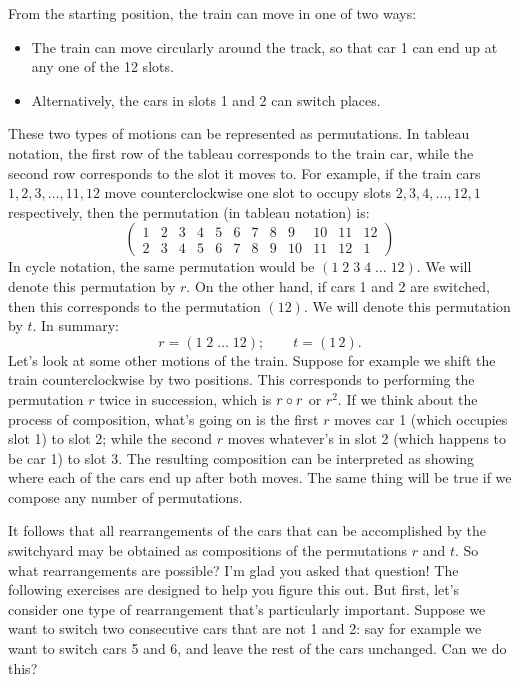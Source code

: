 From the starting position, the train can move in one of two ways:
\begin{itemize}
\item
The train can move circularly around the track, so that car 1 can end up at any one of the 12 slots. 
\item
Alternatively, the cars in slots 1 and 2 can switch places. 
\end{itemize}
These two types of motions can be represented as permutations. In tableau notation, the first row of the tableau corresponds to the train car, while the second row corresponds to the slot it moves to. For example, if the train cars $1,2,3, \ldots ,11, 12$ move counterclockwise one slot to occupy slots $2,3,4,\ldots ,12,1$ respectively, then the permutation (in tableau notation) is:
\[ \left( \begin{array}{cccccccccccc}
1 & 2 & 3 & 4 & 5 & 6 & 7 & 8 & 9 & 10 & 11 & 12 \\
2 & 3 & 4 & 5 & 6 & 7 & 8 & 9 & 10 & 11 & 12 & 1
 \end{array} \right)\] 
In cycle notation,  the same permutation would be $(1 \; 2 \; 3 \; 4 \; \ldots \; 12)$.  We will denote this permutation by $r$. On the other hand, if cars 1 and 2 are switched, then this corresponds to the permutation $(1 2)$. We will denote this permutation by $t$.  In summary:
\[ r = (1 \; 2 \; \ldots \; 12);\qquad  t = (1 \, 2).\]
Let's look at some other motions of the train. Suppose for example we shift the train counterclockwise by two positions. This corresponds to performing the permutation $r$ twice in succession, which is $r \circ r$ or $r^2$.   If we think about the process of composition, what's going on is the first $r$ moves car 1 (which occupies slot 1) to slot 2; while the second $r$ moves whatever's in slot 2 (which happens to be car 1) to slot 3. The resulting composition can be interpreted as showing where each of the cars end up after both moves.  The same thing will be true  if we compose any number of permutations. 

It follows that all rearrangements of the cars that can be accomplished by the switchyard may be obtained as compositions of the permutations $r$ and $t$. So what rearrangements are possible? I'm glad you asked that question! The following exercises are designed to help you figure this out. But first, let's consider one type of rearrangement that's particularly important. Suppose we want to switch two consecutive cars that are not 1 and 2: say for example we want to switch cars 5 and 6, and leave the rest of the cars unchanged.  Can we do this? 

